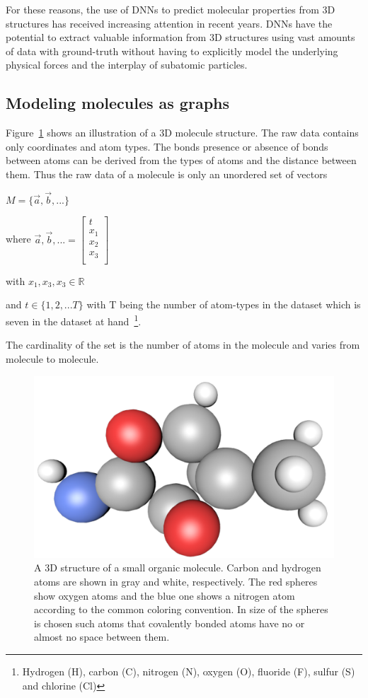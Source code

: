For these reasons, the use of DNNs to predict molecular properties from 3D structures has received increasing attention in recent years. DNNs have the potential to extract valuable information from 3D structures using vast amounts of data with ground-truth without having to explicitly model the underlying physical forces and the interplay of subatomic particles.

\subsection{Modeling molecules as graphs}
\label{sec:molecules-as-graphs}

Figure~\ref{fig:molecule-3d} shows an illustration of a 3D molecule structure. The raw data contains only coordinates and atom types. The bonds presence or absence of bonds between atoms can be derived from the types of atoms and the distance between them. Thus the raw data of a molecule is only an unordered set of vectors



$M = \{\vec{a}, \vec{b}, ... \}$

where $\vec{a}, \vec{b}, ... = \begin{bmatrix}
t \\
x_1 \\
x_2 \\
x_3 \\
\end{bmatrix} $

with $x_1, x_3, x_3 \in \mathbb{R}$

and $t \in \{1, 2, ... T\} $ with T being the number of atom-types in the dataset which is seven in the dataset at hand~\footnote{Hydrogen (H), carbon (C), nitrogen (N), oxygen (O), fluoride (F),  sulfur (S) and chlorine (Cl)}.


The cardinality of the set is the number of atoms in the molecule and varies from molecule to molecule.

\begin{figure}[H]
	\centering
	\includegraphics[width=\linewidth]{figures/molecule-3d-1}
	\caption{A 3D structure of a small organic molecule. Carbon and hydrogen atoms are shown in gray and white, respectively. The red spheres show oxygen atoms and the blue one shows a nitrogen atom according to the common coloring convention. In size of the spheres is chosen such atoms that covalently bonded atoms have no or almost no space between them. 
	}
	\label{fig:molecule-3d}
\end{figure}

